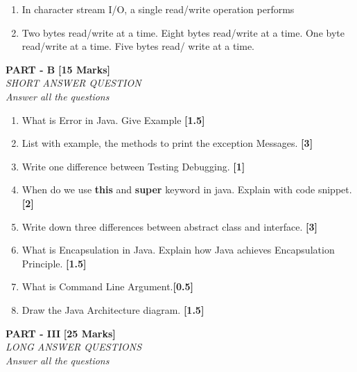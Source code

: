 \documentclass[12pt,a4paper]{exam}
\begin{document}
\begin{enumerate}[start=1,label={\bfseries Q\arabic*)}]
    	\item In character stream I/O, a single read/write operation performs
    	\item[]   
    	\begin{oneparchoices}
    		\choice  Two bytes read/write at a time.%
    		\choice  Eight bytes read/write at a time.
    		\choice One byte read/write at a time.
    		\choice Five bytes read/ write at a time.
    	\end{oneparchoices}
    \end{enumerate}
    
   
    \vspace{0.1mm}
    \begin{center}
    	\textbf{PART - B} \textbf{[15 Marks]}\\
    	\noindent \textit{SHORT ANSWER QUESTION} \\
    	\noindent \textit{Answer all the questions} 
    \end{center}
    
    \begin{enumerate}[start=1,label={\bfseries Q\arabic*)}]
    
    	\item What is Error in Java. Give Example \hfill \textbf{[1.5]}
    	\item List with example, the methods to print the exception Messages. \hfill \textbf{[3]}
    	\item Write one difference between Testing Debugging.  \hfill \textbf{[1]}
    	\item When do we use \textbf{this}  and \textbf{super} keyword in java. Explain with code snippet.\hfill \textbf{[2]}
    	\item Write down three differences between abstract class and interface. \hfill \textbf{[3]}
    	\item What is Encapsulation in Java. Explain how Java achieves Encapsulation Principle. \hfill \textbf{[1.5]}
    	\item What is Command Line Argument.\hfill \textbf{[0.5]}
    	\item Draw the Java Architecture diagram. \hfill \textbf{[1.5]}
    \end{enumerate}
    \pagebreak
    \begin{center}
    	\textbf{PART - III} \textbf{[25 Marks]}\\
    	\noindent \textit{LONG ANSWER QUESTIONS} \\
    	\noindent \textit{Answer all the questions}  
    \end{center}
    
\end{document}
